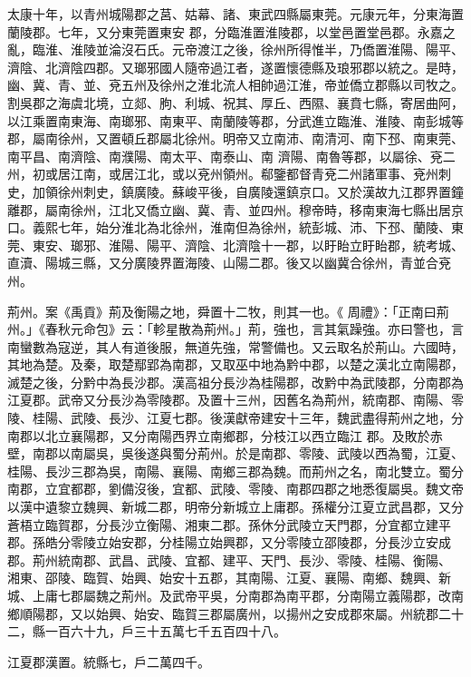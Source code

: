 \begin{pinyinscope}
 太康十年，以青州城陽郡之莒、姑幕、諸、東武四縣屬東莞。元康元年，分東海置蘭陵郡。七年，又分東莞置東安
 郡，分臨淮置淮陵郡，以堂邑置堂邑郡。永嘉之亂，臨淮、淮陵並淪沒石氏。元帝渡江之後，徐州所得惟半，乃僑置淮陽、陽平、濟陰、北濟陰四郡。又瑯邪國人隨帝過江者，遂置懷德縣及琅邪郡以統之。是時，幽、冀、青、並、兗五州及徐州之淮北流人相帥過江淮，帝並僑立郡縣以司牧之。割吳郡之海虞北境，立郯、朐、利城、祝其、厚丘、西隰、襄賁七縣，寄居曲阿，以江乘置南東海、南瑯邪、南東平、南蘭陵等郡，分武進立臨淮、淮陵、南彭城等郡，屬南徐州，又置頓丘郡屬北徐州。明帝又立南沛、南清河、南下邳、南東莞、南平昌、南濟陰、南濮陽、南太平、南泰山、南
 濟陽、南魯等郡，以屬徐、兗二州，初或居江南，或居江北，或以兗州領州。郗鑒都督青兗二州諸軍事、兗州刺史，加領徐州刺史，鎮廣陵。蘇峻平後，自廣陵還鎮京口。又於漢故九江郡界置鐘離郡，屬南徐州，江北又僑立幽、冀、青、並四州。穆帝時，移南東海七縣出居京口。義熙七年，始分淮北為北徐州，淮南但為徐州，統彭城、沛、下邳、蘭陵、東莞、東安、瑯邪、淮陽、陽平、濟陰、北濟陰十一郡，以盱眙立盱眙郡，統考城、直瀆、陽城三縣，又分廣陵界置海陵、山陽二郡。後又以幽冀合徐州，青並合兗州。



 荊州。案《禹貢》荊及衡陽之地，舜置十二牧，則其一也。《
 周禮》：「正南曰荊州。」《春秋元命包》云：「軫星散為荊州。」荊，強也，言其氣躁強。亦曰警也，言南蠻數為寇逆，其人有道後服，無道先強，常警備也。又云取名於荊山。六國時，其地為楚。及秦，取楚鄢郢為南郡，又取巫中地為黔中郡，以楚之漢北立南陽郡，滅楚之後，分黔中為長沙郡。漢高祖分長沙為桂陽郡，改黔中為武陵郡，分南郡為江夏郡。武帝又分長沙為零陵郡。及置十三州，因舊名為荊州，統南郡、南陽、零陵、桂陽、武陵、長沙、江夏七郡。後漢獻帝建安十三年，魏武盡得荊州之地，分南郡以北立襄陽郡，又分南陽西界立南鄉郡，分枝江以西立臨江
 郡。及敗於赤壁，南郡以南屬吳，吳後遂與蜀分荊州。於是南郡、零陵、武陵以西為蜀，江夏、桂陽、長沙三郡為吳，南陽、襄陽、南鄉三郡為魏。而荊州之名，南北雙立。蜀分南郡，立宜都郡，劉備沒後，宜都、武陵、零陵、南郡四郡之地悉復屬吳。魏文帝以漢中遺黎立魏興、新城二郡，明帝分新城立上庸郡。孫權分江夏立武昌郡，又分蒼梧立臨賀郡，分長沙立衡陽、湘東二郡。孫休分武陵立天門郡，分宜都立建平郡。孫皓分零陵立始安郡，分桂陽立始興郡，又分零陵立邵陵郡，分長沙立安成郡。荊州統南郡、武昌、武陵、宜都、建平、天門、長沙、零陵、桂陽、衡陽、
 湘東、邵陵、臨賀、始興、始安十五郡，其南陽、江夏、襄陽、南鄉、魏興、新城、上庸七郡屬魏之荊州。及武帝平吳，分南郡為南平郡，分南陽立義陽郡，改南鄉順陽郡，又以始興、始安、臨賀三郡屬廣州，以揚州之安成郡來屬。州統郡二十二，縣一百六十九，戶三十五萬七千五百四十八。



 江夏郡漢置。統縣七，戶二萬四千。




\end{pinyinscope}
